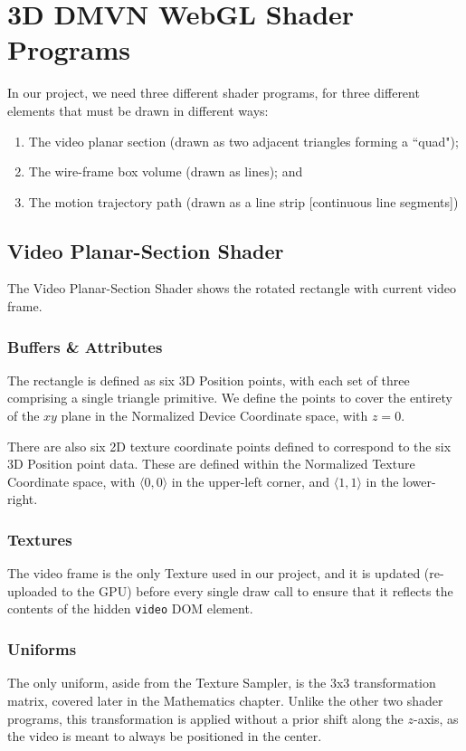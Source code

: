 \section{3D DMVN WebGL Shader Programs}
In our project, we need three different shader programs, for three different elements that must be drawn in different ways:
\begin{enumerate}
    \item The video planar section (drawn as two adjacent triangles forming a ``quad");
    \item The wire-frame box volume (drawn as lines); and
    \item The motion trajectory path (drawn as a line strip [continuous line segments])
\end{enumerate}

\subsection{Video Planar-Section Shader}
The Video Planar-Section Shader shows the rotated rectangle with current video frame.

\subsubsection{Buffers \& Attributes}
The rectangle is defined as six 3D Position points, with each set of three comprising a single triangle primitive. We define the points to cover the entirety of the $xy$ plane in the Normalized Device Coordinate space, with $z=0$.
\par There are also six 2D texture coordinate points defined to correspond to the six 3D Position point data. These are defined within the Normalized Texture Coordinate space, with $\langle 0,0 \rangle$ in the upper-left corner, and $\langle 1,1 \rangle$ in the lower-right.

\subsubsection{Textures}
The video frame is the only Texture used in our project, and it is updated (re-uploaded to the GPU) before every single draw call to ensure that it reflects the contents of the hidden \texttt{video} DOM element.

\subsubsection{Uniforms}
The only uniform, aside from the Texture Sampler, is the 3x3 transformation matrix, covered later in the Mathematics chapter. Unlike the other two shader programs, this transformation is applied without a prior shift along the $z$-axis, as the video is meant to always be positioned in the center.

